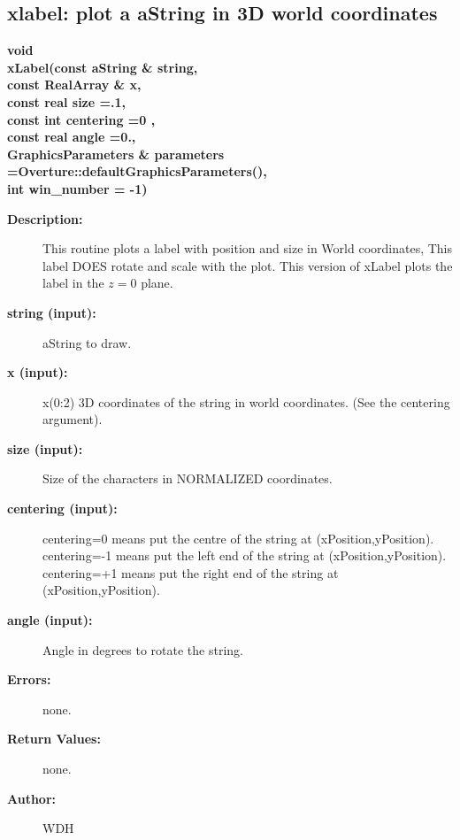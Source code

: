 \subsection{xlabel: plot a aString in 3D world coordinates}
 
\begin{flushleft} \textbf{%
void   \\ 
\settowidth{\GLGraphicsInterfaceIncludeArgIndent}{xLabel(}%
xLabel(const aString \& string,     \\ 
\hspace{\GLGraphicsInterfaceIncludeArgIndent}const RealArray \& x, \\ 
\hspace{\GLGraphicsInterfaceIncludeArgIndent}const real size =.1,\\ 
\hspace{\GLGraphicsInterfaceIncludeArgIndent}const int centering =0 , \\ 
\hspace{\GLGraphicsInterfaceIncludeArgIndent}const real angle =0.,\\ 
GraphicsParameters \& parameters   =Overture::defaultGraphicsParameters(),\\ 
\hspace{\GLGraphicsInterfaceIncludeArgIndent}int win\_number  = -1)
}\end{flushleft}
\begin{description}
\item[{\bf Description:}] 
    This routine plots a label with position and size in World coordinates, 
    This label DOES rotate and scale with the plot. This version of xLabel plots
    the label in the $z=0$ plane.
\item[{\bf string (input):}]  aString to draw.
\item[{\bf x (input):}]  x(0:2) 3D coordinates of the string in world coordinates. (See the
    centering argument).
\item[{\bf size (input):}]  Size of the characters in NORMALIZED coordinates.
\item[{\bf centering (input):}]  {\ff centering=0} means put the centre of the string at {\ff (xPosition,yPosition)}.
    {\ff centering=-1} means put the left end of the string at {\ff (xPosition,yPosition)}.
    {\ff centering=+1} means put the right end of the string at {\ff (xPosition,yPosition)}.
\item[{\bf angle (input):}]  Angle in degrees to rotate the string.
\item[{\bf Errors:}]  none.
\item[{\bf Return Values:}]  none.
  
\item[{\bf Author:}]  WDH
\end{description}
